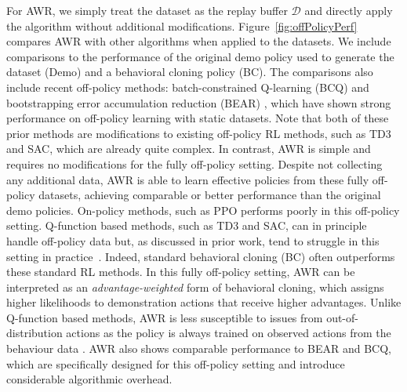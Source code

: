 \documentclass{article} \usepackage{iclr2020_conference,times}
\begin{document}
For AWR, we simply treat the dataset as the replay buffer $\mathcal{D}$ and directly apply the algorithm without additional modifications. Figure~\ref{fig:offPolicyPerf} compares AWR with other algorithms when applied to the datasets. We include comparisons to the performance of the original demo policy used to generate the dataset (Demo)
and a behavioral cloning policy (BC). The comparisons also include recent off-policy methods: batch-constrained Q-learning (BCQ) \citep{fujimoto19offpolicy} and bootstrapping error accumulation reduction (BEAR) \citep{BEAR2019}, which have shown strong performance on off-policy learning with static datasets.
Note that both of these prior methods are modifications to existing off-policy RL methods, such as TD3 and SAC, which are already quite complex. In contrast, AWR is simple and requires no modifications for the fully off-policy setting.
Despite not collecting any additional data, AWR is able to learn effective policies from these fully off-policy datasets, achieving comparable or better performance than the original demo policies. On-policy methods, such as PPO performs poorly in this off-policy setting. Q-function based methods, such as TD3 and SAC, can in principle handle off-policy data but, as discussed in prior work, tend to struggle in this setting in practice~\citep{fujimoto19offpolicy,BEAR2019}. Indeed, standard behavioral cloning (BC) often outperforms these standard RL methods.
In this fully off-policy setting, AWR can be interpreted as an \emph{advantage-weighted} form of behavioral cloning, which assigns higher likelihoods to demonstration actions that receive higher advantages. Unlike Q-function based methods, AWR is less susceptible to issues from out-of-distribution actions as the policy is always trained on observed actions from the behaviour data \citep{BEAR2019}. AWR also shows comparable performance to BEAR and BCQ, which are specifically designed for this off-policy setting and introduce considerable algorithmic overhead.
\end{document}
